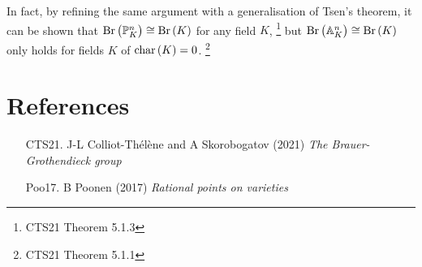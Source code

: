 \documentclass{article}
\renewcommand{\AA}{\mathbb{A}}
\newcommand{\br}{\del}
\newcommand{\Br}{\mathrm{Br}}
\newcommand{\ch}{\mathrm{char}}
\newcommand{\PP}{\mathbb{P}}
\begin{document}
In fact, by refining the same argument with a generalisation of Tsen's theorem, it can be shown that $ \Br\br{\PP_K^n} \cong \Br\br{K} $ for any field $ K $, \footnote{CTS21 Theorem 5.1.3} but $ \Br\br{\AA_K^n} \cong \Br\br{K} $ only holds for fields $ K $ of $ \ch\br{K} = 0 $. \footnote{CTS21 Theorem 5.1.1}

\section*{References}

\begin{itemize}[leftmargin=0.5in]
\item[CTS21.] J-L Colliot-Th\'el\`ene and A Skorobogatov (2021) \emph{The Brauer-Grothendieck group}
\item[Poo17.] B Poonen (2017) \emph{Rational points on varieties}
\end{itemize}
\end{document}

